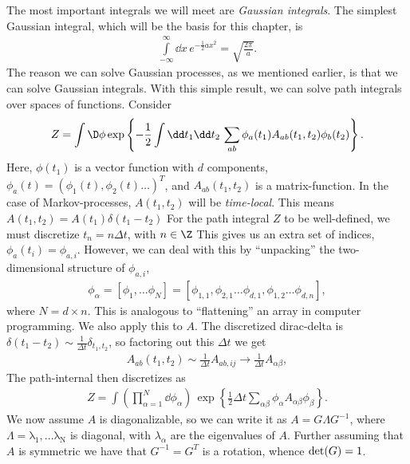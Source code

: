 The most important integrals we will meet are \emph{Gaussian integrals}.
The simplest Gaussian integral, which will be the basis for this chapter, is
%
\begin{align}\label{eq: gaussian integral}
    \int\limits_{-\infty}^\infty \dd x \, e^{-\frac{1}{2} a x^2} = \sqrt{ \frac{ 2 \pi  }{ a }}.
\end{align}
%
The reason we can solve Gaussian processes, as we mentioned earlier, is that we can solve Gaussian integrals.
With this simple result, we can solve path integrals over spaces of functions.
Consider
%
\begin{align}
    Z = \int \D \phi
    \exp \left\{ 
        - \frac{1}{2} \int \dd t_1 \dd t_2 \, 
        \sum_{ab}
        \phi_a(t_1) A_{ab}(t_1, t_2) \phi_b(t_2)
    \right\}.
\end{align}
%
Here, $\phi(t_1)$ is a vector function with $d$ components, $\phi_a(t) = (\phi_1(t), \phi_2(t)\dots)^T$, and $A_{ab}(t_1, t_2)$ is a matrix-function.
In the case of Markov-processes, $A(t_1, t_2)$ will be \emph{time-local}.
This means $A(t_1, t_2) = A(t_1) \delta(t_1 - t_2)$
For the path integral $Z$ to be well-defined, we must discretize $t_n = n \Delta t$, with $n \in \Z$
This gives us an extra set of indices, $\phi_a(t_i) = \phi_{a,i}$.
However, we can deal with this by ``unpacking'' the two-dimensional structure of $\phi_{a,i}$,
%
\begin{align}
    \phi_\alpha = 
    \left[\phi_1, ... \phi_N\right]
    =
    \left[
        \phi_{1, 1}, \phi_{2, 1}\dots\phi_{d,1}, \phi_{1, 2}\dots\phi_{d, n}
    \right],
\end{align}
%
where $N = d \times n$.
This is analogous to ``flattening'' an array in computer programming.
We also apply this to $A$.
The discretized dirac-delta is $\delta(t_1 - t_2) \sim \frac{1}{\Delta t} \delta_{t_1, t_2}$, so factoring out this $\Delta t$ we get 
%
\begin{align}
    A_{ab}(t_1,t_2)
    \sim \frac{1}{\Delta t} A_{ab,ij}
    \rightarrow \frac{1}{\Delta t} A_{\alpha \beta},
\end{align}
%
The path-internal then discretizes as 
%
\begin{align}
    Z = \int \left( \prod_{\alpha=1}^N \dd \phi_\alpha \right) \, 
    \exp \left\{ 
        \frac{1}{2} \Delta t \sum_{\alpha \beta} 
        \phi_\alpha A_{\alpha \beta} \phi_\beta
    \right\}.
\end{align}
%
We now assume $A$ is diagonalizable, so we can write it as $A = G \Lambda G^{-1} $, where $\Lambda = \mathrm{\lambda_1, ... \lambda_N}$ is diagonal, with $\lambda_\alpha$ are the eigenvalues of $A$. Further assuming that $A$ is symmetric we have that $G^{-1}=G^T$ is a rotation, whence ${\rm det}(G)=1$.
